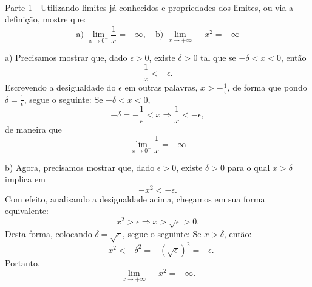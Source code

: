 \paragraph{}Parte 1 - Utilizando limites j\'a conhecidos e propriedades dos limites, ou via a defini\c c\~ao, mostre que:
$$
\text{a) }\lim_{x\to{0^{-}}}{\frac{1}{x}} = -\infty, \quad \text{b) }\lim_{x\to+\infty} -x^2 = -\infty
$$
\begin{sol*}
a) Precisamos mostrar que, dado $\epsilon > 0$, existe $\delta > 0$ tal que se $-\delta < x < 0$, ent\~ao 
$$
\frac{1}{x} < -\epsilon.
$$
Escrevendo a desigualdade do $\epsilon$ em outras palavras, $x > -\frac{1}{\epsilon}$, de forma que pondo $\delta = \frac{1}{\epsilon}$, segue o seguinte: Se $-\delta < x < 0$,  
$$
-\delta  = -\frac{1}{\epsilon} < x \Rightarrow \frac{1}{x} < -\epsilon,
$$
de maneira que 
$$
\lim_{x\to{0^{-}}}{\frac{1}{x}} = -\infty
$$

b) Agora, precisamos mostrar que, dado $\epsilon > 0$, existe $\delta > 0$ para o qual $x > \delta$ implica em
$$
-x^2 < -\epsilon.
$$
Com efeito, analisando a desigualdade acima, chegamos em sua forma equivalente:
$$
x^2 > \epsilon\Rightarrow x > \sqrt{\epsilon} > 0.
$$
Desta forma, colocando $\delta = \sqrt{\epsilon}$, segue o seguinte: Se $x > \delta$, ent\~ao:
$$
-x^2 < -\delta^2 = -(\sqrt{\epsilon})^2 = -\epsilon.
$$
Portanto, 
$$
\lim_{x\to+\infty} -x^2 = -\infty.
$$
\qedsymbol
\end{sol*}

